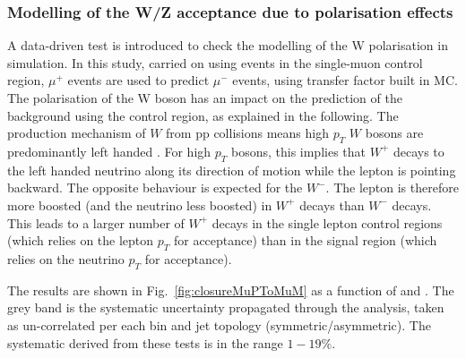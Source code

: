 \subsubsection*{Modelling of the W/Z acceptance due to polarisation effects}
\label{sec:tfSyst_Wpol}
A data-driven test is introduced to check the modelling of the W polarisation in simulation. 
In this study, carried on using events in the single-muon control region, $\mu^{+}$ events 
are used to predict $\mu^{-}$ events, using transfer factor built in MC. 
The polarisation of the W boson has an impact on the prediction 
of the \znunu background using the \mj control region, as explained in the following. 
The production mechanism of $W$ from pp
collisions means high $p_T$ $W$ bosons are predominantly left handed
\cite{WPol}.  For high $p_T$ bosons, this implies that $W^+$ decays to
the left handed neutrino along its direction of motion while the
lepton is pointing backward. The opposite behaviour is expected for
the $W^-$. The lepton is therefore more boosted (and the neutrino less
boosted) in $W^+$ decays than $W^-$ decays.  This leads to a larger
number of $W^+$ decays in the single lepton control regions (which
relies on the lepton $p_T$ for acceptance) than in the signal region
(which relies on the neutrino $p_T$ for acceptance).

The results are shown in Fig.~\ref{fig:closureMuPToMuM} as a function of \scalht and \njet. 
The grey band is the systematic uncertainty propagated through the analysis, 
taken as un-correlated per each \scalht bin and jet topology (symmetric/asymmetric). The systematic derived from these tests is
in the range $1-19\%$.



